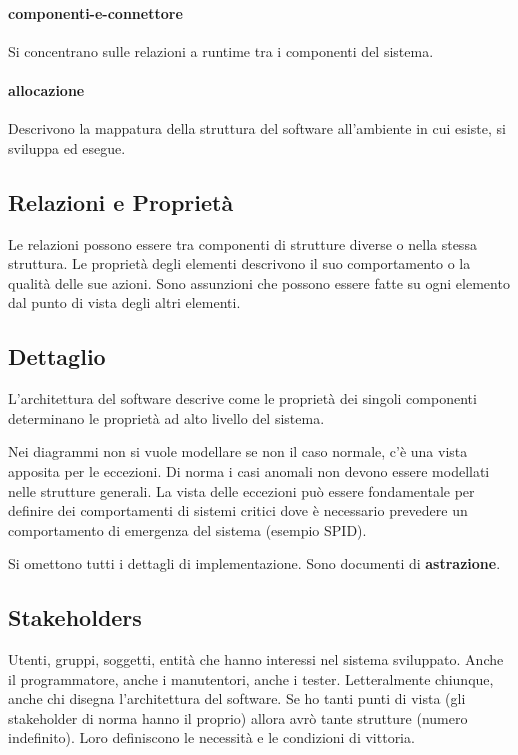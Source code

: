 \paragraph{componenti-e-connettore}

Si concentrano sulle relazioni a runtime tra i componenti del sistema.

\paragraph{allocazione}

Descrivono la mappatura della struttura del software all'ambiente in cui esiste, si sviluppa ed esegue.

\subsection{Relazioni e Propriet\`a}

Le relazioni possono essere tra componenti di strutture diverse o nella stessa struttura.
Le propriet\`a degli elementi descrivono il suo comportamento o la qualit\`a delle sue azioni.
Sono assunzioni che possono essere fatte su ogni elemento dal punto di vista degli altri elementi.

\subsection{Dettaglio}

L'architettura del software descrive come le propriet\`a dei singoli componenti determinano le propriet\`a ad alto livello del sistema.

Nei diagrammi non si vuole modellare se non il caso normale, c'\`e una vista apposita per le eccezioni. Di norma i casi anomali non devono essere modellati nelle strutture generali. La vista delle eccezioni pu\`o essere fondamentale per definire dei comportamenti di sistemi critici dove \`e necessario prevedere un comportamento di emergenza del sistema (esempio SPID).

Si omettono tutti i dettagli di implementazione. Sono documenti di \textbf{astrazione}.

\subsection{Stakeholders}

Utenti, gruppi, soggetti, entit\`a che hanno interessi nel sistema sviluppato. Anche il programmatore, anche i manutentori, anche i tester. Letteralmente chiunque, anche chi disegna l'architettura del software. Se ho tanti punti di vista (gli stakeholder di norma hanno il proprio) allora avr\`o tante strutture (numero indefinito). Loro definiscono le necessit\`a e le condizioni di vittoria.

